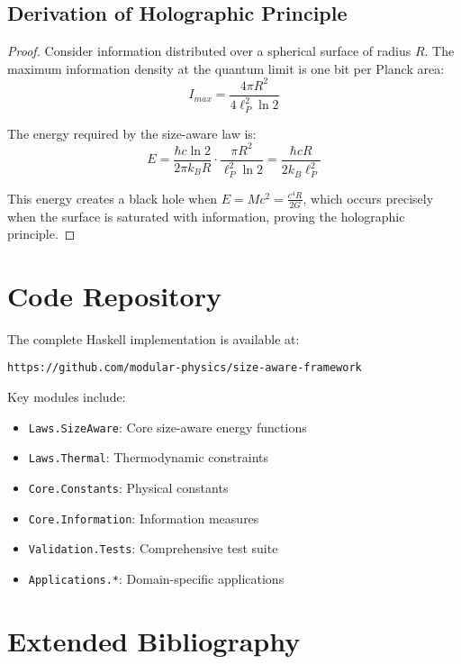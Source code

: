 \documentclass[11pt,a4paper]{article}
\theoremstyle{definition}
\begin{document}
\subsection{Derivation of Holographic Principle}

\begin{proof}
Consider information distributed over a spherical surface of radius $R$. The maximum information density at the quantum limit is one bit per Planck area:
\begin{equation}
I_{max} = \frac{4\pi R^2}{4\ell_P^2 \ln 2}
\end{equation}

The energy required by the size-aware law is:
\begin{equation}
E = \frac{\hbar c \ln 2}{2\pi k_B R} \cdot \frac{\pi R^2}{\ell_P^2 \ln 2} = \frac{\hbar c R}{2k_B \ell_P^2}
\end{equation}

This energy creates a black hole when $E = Mc^2 = \frac{c^4 R}{2G}$, which occurs precisely when the surface is saturated with information, proving the holographic principle.
\end{proof}

\section{Code Repository}

The complete Haskell implementation is available at:
\begin{verbatim}
https://github.com/modular-physics/size-aware-framework
\end{verbatim}

Key modules include:
\begin{itemize}
\item \texttt{Laws.SizeAware}: Core size-aware energy functions
\item \texttt{Laws.Thermal}: Thermodynamic constraints
\item \texttt{Core.Constants}: Physical constants
\item \texttt{Core.Information}: Information measures
\item \texttt{Validation.Tests}: Comprehensive test suite
\item \texttt{Applications.*}: Domain-specific applications
\end{itemize}

\section{Extended Bibliography}
\end{document}
